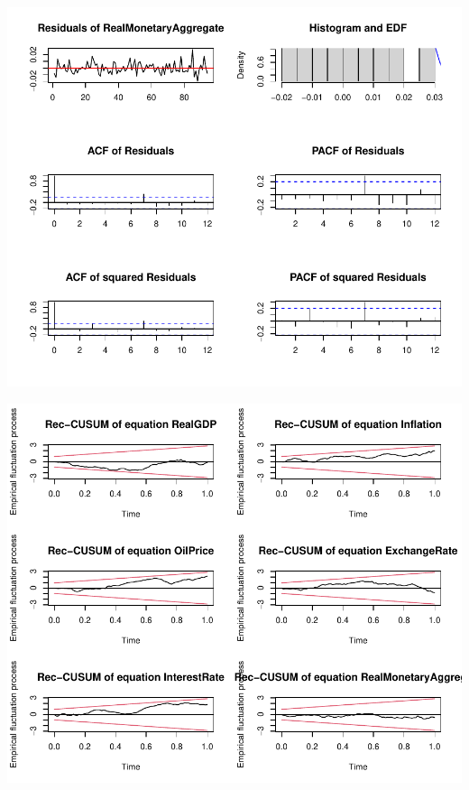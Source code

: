 \documentclass[11pt,preprint, authoryear]{elsarticle}
\let\origfigure\figure
\let\endorigfigure\endfigure
\renewenvironment{figure}[1][2] {
    \expandafter\origfigure\expandafter[H]
} {
    \endorigfigure
}
\numberwithin{equation}{section}
\numberwithin{figure}{section}
\numberwithin{table}{section}
\begin{document}
\begin{figure}
\centering
\includegraphics{Time_Series_Proj_Data_files/figure-latex/unnamed-chunk-10-1.pdf}
\caption{Diagnostics plot of VAR(2) for Real Money\label{figA6}}
\end{figure}

\begin{figure}
\centering
\includegraphics{Time_Series_Proj_Data_files/figure-latex/unnamed-chunk-11-1.pdf}
\caption{OLS-CUSUM test for VAR(2)\label{figA7}}
\end{figure}
\end{document}
